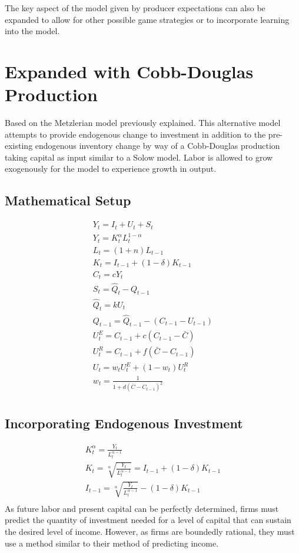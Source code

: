 \documentclass[]{article}
\begin{document}
The key aspect of the model given by producer expectations can also be expanded to allow for other possible game strategies or to incorporate learning into the model. 
\pagebreak
\section{Expanded with Cobb-Douglas Production}
	Based on the Metzlerian model previously explained. This alternative model attempts to provide endogenous change to investment in addition to the pre-existing endogenous inventory change by way of a Cobb-Douglas production taking capital as input similar to a Solow model. Labor is allowed to grow exogenously for the model to experience growth in output.
\subsection*{Mathematical Setup}
\begin{gather*}
	Y_t = I_t + U_t + S_t\\
	Y_t = K_t^\alpha L_t^{1-\alpha}\\
	L_t = (1+n) L_{t-1}\\
	K_t = I_{t-1} + (1-\delta) K_{t-1}\\
	C_t = cY_t\\
	S_t=\hat Q_t-Q_{t-1}\\
	\hat Q_t=k U_t\\
	Q_{t-1}=\hat Q_{t-1}-(C_{t-1}-U_{t-1})\\
	U_t^E=C_{t-1}+c(C_{t-1}-\bar C)\\
	U_t^R=C_{t-1}+f(\bar C-C_{t-1})\\
	U_t=w_tU_t^E+(1-w_t)U_t^R\\
	w_t=\frac{1}{1+d(\bar C-C_{t-1})^2}\\
\end{gather*}
\subsection*{Incorporating Endogenous Investment}
\begin{gather*}
	K_t^\alpha =\frac{ Y_t }{ L_t^{\alpha-1} }\\
	K_t = \sqrt[\alpha]{\frac{Y_t}{L_t^{\alpha-1}}} = I_{t-1} + (1-\delta) K_{t-1}\\
	I_{t-1} = \sqrt[\alpha]{\frac{Y_t}{L_t^{\alpha-1}}} - (1-\delta) K_{t-1}\\
\end{gather*}
As future labor and present capital can be perfectly determined, firms must predict the quantity of investment needed for a level of capital that can sustain the desired level of income. However, as firms are boundedly rational, they must use a method similar to their method of predicting income.
\end{document}

